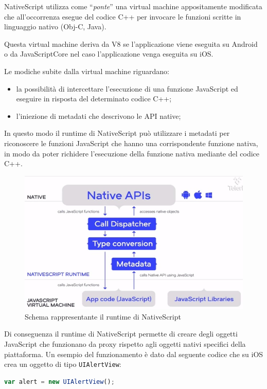 NativeScript utilizza come ``\textit{ponte}'' una virtual machine appositamente modificata che all'occorrenza esegue del codice C++ per invocare le funzioni scritte in linguaggio nativo (Obj-C, Java).

Questa virtual machine deriva da \gls{V8} se l'applicazione viene eseguita su Android o da \gls{JavaScriptCore} nel caso l'applicazione venga eseguita su iOS.

Le modiche subite dalla virtual machine riguardano:
\begin{itemize}
\item la possibilità di intercettare l'esecuzione di una funzione JavaScript ed eseguire in risposta del determinato codice C++;
\item l'iniezione di metadati che descrivono le API native;
\end{itemize} 
In questo modo il runtime di NativeScript può utilizzare i metadati per riconoscere le funzioni JavaScript che hanno una corrispondente funzione nativa, in modo da poter richidere l'esecuzione della funzione nativa mediante del codice C++.

\begin{figure}[htp]
\centering
\includegraphics[width=\textwidth*3/4]{../immagini/ns-runtime}
\caption{Schema rappresentante il runtime di NativeScript}  
\end{figure}
\FloatBarrier

Di conseguenza il runtime di NativeScript permette di creare degli oggetti JavaScript che funzionano da \gls{proxy} rispetto agli oggetti nativi specifici della piattaforma.
Un esempio del funzionamento è dato dal seguente codice che su iOS crea un oggetto di tipo \texttt{UIAlertView}:

\begin{lstlisting}[language=JavaScript, caption=Esempio di creazione di un oggetto nativo]
var alert = new UIAlertView();
\end{lstlisting}

